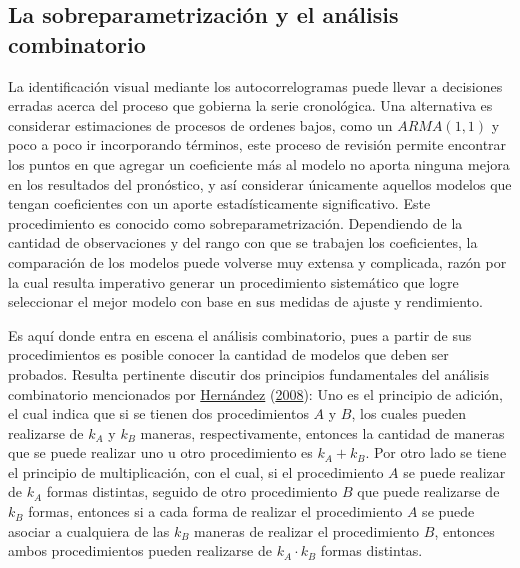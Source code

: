 \documentclass[
]{article}
\begin{document}
\subsection{La sobreparametrización y el análisis combinatorio}

La identificación visual mediante los autocorrelogramas puede llevar a
decisiones erradas acerca del proceso que gobierna la serie cronológica.
Una alternativa es considerar estimaciones de procesos de ordenes bajos,
como un \(ARMA(1,1)\) y poco a poco ir incorporando términos, este
proceso de revisión permite encontrar los puntos en que agregar un
coeficiente más al modelo no aporta ninguna mejora en los resultados del
pronóstico, y así considerar únicamente aquellos modelos que tengan
coeficientes con un aporte estadísticamente significativo. Este
procedimiento es conocido como sobreparametrización. Dependiendo de la
cantidad de observaciones y del rango con que se trabajen los
coeficientes, la comparación de los modelos puede volverse muy extensa y
complicada, razón por la cual resulta imperativo generar un
procedimiento sistemático que logre seleccionar el mejor modelo con base
en sus medidas de ajuste y rendimiento.

Es aquí donde entra en escena el análisis combinatorio, pues a partir de
sus procedimientos es posible conocer la cantidad de modelos que deben
ser probados. Resulta pertinente discutir dos principios fundamentales
del análisis combinatorio mencionados por
\protect\hyperlink{ref-analisis_combinatorio}{Hernández}
(\protect\hyperlink{ref-analisis_combinatorio}{2008}): Uno es el
principio de adición, el cual indica que si se tienen dos procedimientos
\(A\) y \(B\), los cuales pueden realizarse de \(k_A\) y \(k_B\)
maneras, respectivamente, entonces la cantidad de maneras que se puede
realizar uno u otro procedimiento es \(k_A + k_B\). Por otro lado se
tiene el principio de multiplicación, con el cual, si el procedimiento
\(A\) se puede realizar de \(k_A\) formas distintas, seguido de otro
procedimiento \(B\) que puede realizarse de \(k_B\) formas, entonces si
a cada forma de realizar el procedimiento \(A\) se puede asociar a
cualquiera de las \(k_B\) maneras de realizar el procedimiento \(B\),
entonces ambos procedimientos pueden realizarse de \(k_A \cdot k_B\)
formas distintas.
\end{document}
